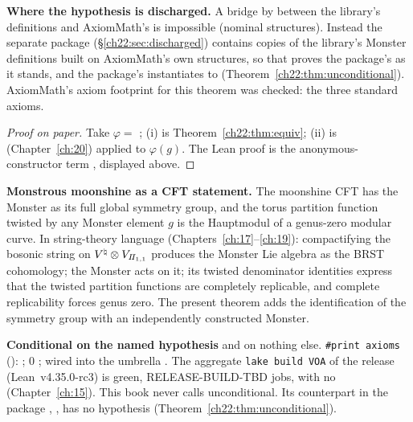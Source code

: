 \begin{dictionary}
\textbf{Where the hypothesis is discharged.}  A bridge by  between the library's definitions and AxiomMath's is
impossible (nominal structures).  Instead the separate package  (\S\ref{ch22:sec:discharged})
contains copies of the library's Monster definitions built on AxiomMath's own structures, so that  proves
the package's  as it stands, and the package's  instantiates to
 (Theorem~\ref{ch22:thm:unconditional}).  AxiomMath's axiom footprint for this theorem
was checked: the three standard axioms.
\end{dictionary}

\begin{proof}[Proof on paper]
Take $\varphi=$ ; (i) is Theorem~\ref{ch22:thm:equiv}; (ii) is  (Chapter~\ref{ch:20})
applied to $\varphi(g)$.  The Lean proof is the anonymous-constructor term
, displayed above.
\end{proof}

\begin{physics}
\textbf{Monstrous moonshine as a CFT statement.}  The moonshine CFT has the Monster as its full global symmetry group, and the
torus partition function twisted by any Monster element $g$ is the Hauptmodul of a genus-zero modular curve.  In string-theory
language (Chapters~\ref{ch:17}--\ref{ch:19}): compactifying the bosonic string on ${V^{\natural}}\otimes V_{I\!I_{1,1}}$ produces the
Monster Lie algebra as the BRST cohomology; the Monster acts on it; its twisted denominator identities express that the
twisted partition functions are completely replicable, and complete replicability forces genus zero.  The present theorem
adds the identification of the symmetry group with an independently constructed Monster.
\end{physics}

\begin{status}
\textbf{Conditional on the named hypothesis } and on nothing else.  \texttt{\#print axioms}
(): ; $0$ ; wired
into the umbrella .  The aggregate \texttt{lake build VOA} of the release (Lean~v4.35.0-rc3) is green,
RELEASE-BUILD-TBD jobs, with no  (Chapter~\ref{ch:15}).  This book never calls 
unconditional.  Its counterpart in the package , , has no
hypothesis (Theorem~\ref{ch22:thm:unconditional}).
\end{status}


